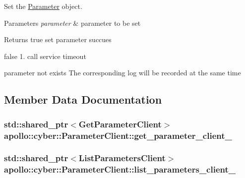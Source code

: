 Set the \hyperlink{classapollo_1_1cyber_1_1Parameter}{Parameter} object. 


\begin{DoxyParams}{Parameters}
{\em parameter} & parameter to be set \\
\hline
\end{DoxyParams}
\begin{DoxyReturn}{Returns}
true set parameter succues 

false 1. call service timeout
\begin{DoxyEnumerate}
\item parameter not exists The corresponding log will be recorded at the same time 
\end{DoxyEnumerate}
\end{DoxyReturn}


\subsection{Member Data Documentation}
\hypertarget{classapollo_1_1cyber_1_1ParameterClient_a465bd69389ab52ec3712ac9ec0e8597b}{
\subsubsection[{get\-\_\-parameter\-\_\-client\-\_\-}]{\setlength{\rightskip}{0pt plus 5cm}std\-::shared\-\_\-ptr$<${\bf Get\-Parameter\-Client}$>$ apollo\-::cyber\-::\-Parameter\-Client\-::get\-\_\-parameter\-\_\-client\-\_\-\hspace{0.3cm}{\ttfamily [private]}}}\label{classapollo_1_1cyber_1_1ParameterClient_a465bd69389ab52ec3712ac9ec0e8597b}
\hypertarget{classapollo_1_1cyber_1_1ParameterClient_ad8aa89ded98dc6f21245cf6145ba6888}{
\subsubsection[{list\-\_\-parameters\-\_\-client\-\_\-}]{\setlength{\rightskip}{0pt plus 5cm}std\-::shared\-\_\-ptr$<${\bf List\-Parameters\-Client}$>$ apollo\-::cyber\-::\-Parameter\-Client\-::list\-\_\-parameters\-\_\-client\-\_\-\hspace{0.3cm}{\ttfamily [private]}}}\label{classapollo_1_1cyber_1_1ParameterClient_ad8aa89ded98dc6f21245cf6145ba6888}
